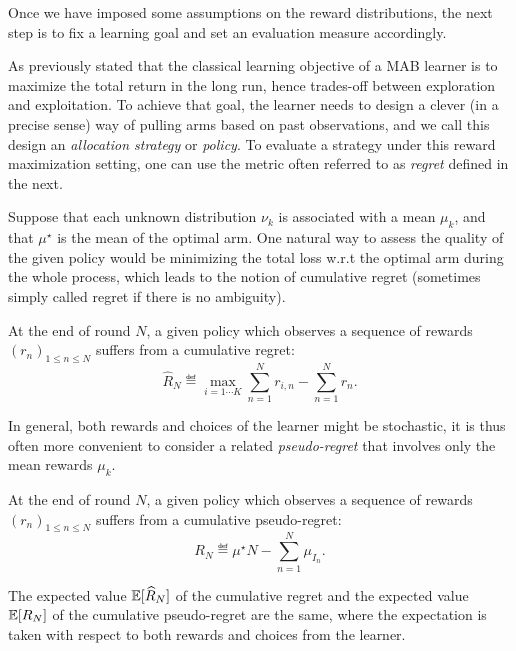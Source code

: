 Once we have imposed some assumptions on the reward distributions, the next step is to fix a learning goal and set an evaluation measure accordingly.

As previously stated that the classical learning objective of a MAB learner is to maximize the total return in the long run, hence trades-off between exploration and exploitation. To achieve that goal, the learner needs to design a clever (in a precise sense) way of pulling arms based on past observations, and we call this design an \emph{allocation strategy} or \emph{policy}. To evaluate a strategy under this reward maximization setting, one can use the metric often referred to as \emph{regret} defined in the next. 

Suppose that each unknown distribution $\nu_k$ is associated with a mean $\mu_k$, and that $\mu^{\star}$ is the mean of the optimal arm. One natural way to assess the quality of the given policy would be minimizing the total loss w.r.t the optimal arm during the whole process, which leads to the notion of \gls{cumulative regret} (sometimes simply called regret if there is no ambiguity).

\begin{definition}\label{def:mab.cumulative_regret}
\begin{leftbar}[defnbar]
	At the end of round $N$, a given policy which observes a sequence of rewards $(r_n)_{1 \leq n \leq N}$ suffers from a cumulative regret:
	\[
		\hat{R}_N \eqdef \max_{i=1\cdots K} \sum_{n=1}^N r_{i,n} - \sum_{n=1}^N r_n.
	\]
\end{leftbar}
\end{definition}

In general, both rewards and choices of the learner might be stochastic, it is thus often more convenient to consider a related \emph{pseudo-regret} that involves only the mean rewards $\mu_k$.

\begin{definition}\label{def:mab.pseudo_regret}
\begin{leftbar}[defnbar]
	At the end of round $N$, a given policy which observes a sequence of rewards $(r_n)_{1 \leq n \leq N}$ suffers from a cumulative pseudo-regret:
	\[
		R_N \eqdef \mu^{\star}N - \sum_{n=1}^N \mu_{I_n}.
	\]
\end{leftbar}
\end{definition}

\begin{proposition}\label{prop:mab.pseudo_regret}
\begin{leftbar}[propositionbar]
	The expected value $\mathbb{E}[\widehat{R}_N]$ of the cumulative regret and the expected value $\mathbb{E}[R_N]$ of the cumulative pseudo-regret are the same, where the expectation is taken with respect to both rewards and choices from the learner.
\end{leftbar}
\end{proposition}


